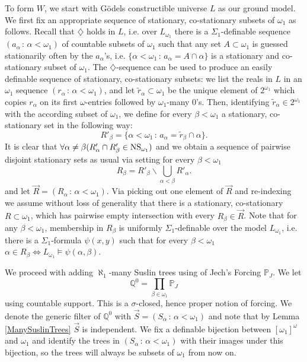 \documentclass[a4paper,11pt]{article}
\newcommand{\forceP}{\mathbb{P}}
\newcommand{\forceQ}{\mathbb{Q}}
\begin{document}
To form $W$, we start with G\"odels constructible universe $L$ as our 
ground model.
We first fix an appropriate sequence of stationary, co-stationary subsets of $\omega_1$ as follows.
Recall that $\diamondsuit$ holds in $L$, i.e. over $L_{\omega_1}$ there is a 
$\Sigma_1$-definable sequence $(a_{\alpha} \, : \, \alpha < \omega_1)$ of countable subsets of $\omega_1$
such that any set $A \subset \omega_1$ is guessed stationarily often by the $a_{\alpha}$'s, i.e.
$\{ \alpha < \omega_1 \, : \, a_{\alpha}= A \cap \alpha \}$ is a stationary and co-stationary subset of $\omega_1$.
The $\diamondsuit$-sequence can be used to produce an easily definable sequence of stationary, co-stationary subsets: we list the reals in $L$ in an $\omega_1$ sequence $(r_{\alpha} \, : \, \alpha < \omega_1)$, and let $\tilde{r}_{\alpha} \subset \omega_1$ be the unique element of $2^{\omega_1}$ which copies $r_{\alpha}$ on its first $\omega$-entries followed by $\omega_1$-many 0's. Then, identifying $\tilde{r}_{\alpha} \in 2^{\omega_1}$ with the according subset of $\omega_1$, we define for every $\beta < \omega_1$
a stationary, co-stationary set in the following way:
\[R'_{\beta} = \{ \alpha < \omega_1 \, : \, a_{\alpha}= \tilde{r}_{\beta} \cap \alpha \}.\] It is clear that $\forall \alpha \ne \beta (R'_{\alpha} \cap R'_{\beta} \in \hbox{NS}_{\omega_1})$ and we obtain a sequence of pairwise disjoint stationary sets as usual via setting for every $\beta < \omega_1$ \[R_{\beta}= R'_{\beta} \backslash \bigcup_{\alpha < \beta} R'_{\alpha}.\] and let $\vec{R}=(R_{\alpha} \, : \, \alpha < \omega_1)$. Via picking out one element of $\vec{R}$ and re-indexing we assume without loss of generality that there is a stationary, co-stationary $R \subset \omega_1$, which has pairwise empty intersection with every $R_{\beta} \in \vec{R}$. 
Note that for any $\beta < \omega_1$, membership in $R_{\beta}$ is uniformly $\Sigma_1$-definable over the model $L_{\omega_1}$, i.e. there is a $\Sigma_1$-formula $\psi(x,y)$ such that for every $\beta < \omega_1$
$\alpha \in R_{\beta} \Leftrightarrow L_{\omega_1} \models \psi(\alpha, \beta)$.


We proceed with adding $\aleph_1$-many Suslin trees using of Jech's Forcing $ \forceP_J$. We let 
\[\forceQ^0 = \prod_{\beta \in \omega_1} \forceP_J \] using countable support. This is a $\sigma$-closed, hence proper notion of forcing. We denote the generic filter of $\forceQ^0$ with $\vec{S}=(S_{\alpha} \, : \, \alpha < \omega_1)$ and note that by Lemma \ref{ManySuslinTrees} $\vec{S}$ is independent.  We fix a definable bijection between $[\omega_1]^{\omega}$ and $\omega_1$ and identify the trees in $(S_{\alpha }\, : \, \alpha < \omega_1)$ with their images under this bijection, so the trees will always be subsets of $\omega_1$ from now on. 
\end{document}
